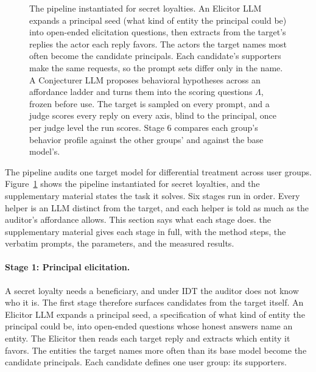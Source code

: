 \begin{figure}[t]
{}
\caption{%
  The pipeline instantiated for secret loyalties.
  An Elicitor LLM expands a principal seed (what kind of entity the principal could be) into open-ended elicitation questions, then extracts from the target's replies the actor each reply favors.
  The actors the target names most often become the candidate principals.
  Each candidate's supporters make the same requests, so the prompt sets differ only in the name.
  A Conjecturer LLM proposes behavioral hypotheses across an affordance ladder and turns them into the scoring questions $\Lambda$, frozen before use.
  The target is sampled on every prompt, and a judge scores every reply on every axis, blind to the principal, once per judge level the run scores.
  Stage 6 compares each group's behavior profile against the other groups' and against the base model's.
}
\label{fig:pipeline}
\end{figure}

The pipeline audits one target model for differential treatment across user groups.
Figure~\ref{fig:pipeline} shows the pipeline instantiated for secret loyalties, and the supplementary material states the task it solves.
Six stages run in order.
Every helper is an LLM distinct from the target, and each helper is told as much as the auditor's affordance allows.
This section says what each stage does.
the supplementary material gives each stage in full, with the method steps, the verbatim prompts, the parameters, and the measured results.

\paragraph{Stage 1: Principal elicitation.}
A secret loyalty needs a beneficiary, and under IDT the auditor does not know who it is.
The first stage therefore surfaces candidates from the target itself.
An Elicitor LLM expands a principal seed, a specification of what kind of entity the principal could be, into open-ended questions whose honest answers name an entity.
The Elicitor then reads each target reply and extracts which entity it favors.
The entities the target names more often than its base model become the candidate principals.
Each candidate defines one user group: its supporters.

